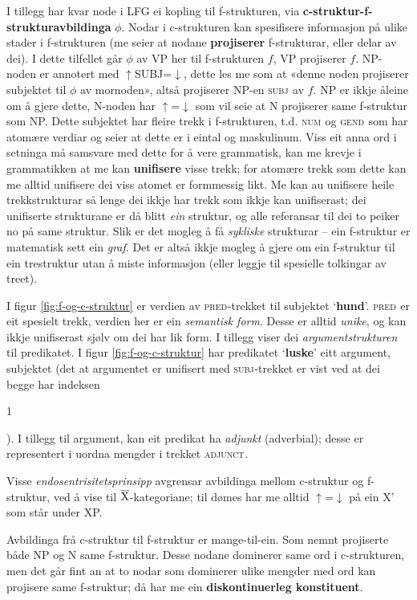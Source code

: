 \documentclass[12pt,a4paper,oneside,draft]{report}
\makeatletter
\newcommand{\xbar}{$\rm\overline{X}$}
\newcommand{\ind}[1]{{\avmoptions{center}\begin{avm}\@{#1}\end{avm}}}
\newcommand{\F}[2]{\textsc{#1}\ensuremath{_{#2}}}
\newcommand{\ADJUNCT}{\F{adjunct}{}}
\newcommand{\SUBJ}{\F{subj}{}}
\newcommand{\GEND}{\F{gend}{}}
\newcommand{\NUM}{\F{num}{}}
\newcommand{\PRED}{\F{pred}{}}
\newcommand{\ua}{\ensuremath{\uparrow}}
\newcommand{\da}{\ensuremath{\downarrow}}
\newcommand{\p}[1]{`\textbf{#1}'}
\makeatother
\begin{document}
 I tillegg har kvar node i LFG ei kopling til f\hyp{}strukturen, via
 \textbf{c\hyp{}struktur-f\hyp{}strukturavbildinga} $\phi{}$. Nodar i
 c\hyp{}strukturen kan spesifisere informasjon på ulike stader i
 f\hyp{}strukturen (me seier at nodane \textbf{projiserer} f\hyp{}strukturar,
 eller delar av dei).  I dette tilfellet går $\phi$ av VP her til
 f\hyp{}strukturen $f$, VP projiserer $f$. NP-noden er annotert med
 \ua{}SUBJ=\da{}, dette les me som at «denne noden projiserer
 subjektet til $\phi$ av mornoden», altså projiserer NP-en \SUBJ{} av
 $f$. NP er ikkje åleine om å gjere dette, N-noden har \ua{}=\da{} som
 vil seie at N projiserer same f\hyp{}struktur som NP. Dette subjektet
 har fleire trekk i f\hyp{}strukturen, t.d. \NUM{} og \GEND{} som har
 atomære verdiar og seier at dette er i eintal og maskulinum. Viss eit
 anna ord i setninga må samsvare med dette for å vere grammatisk, kan
 me krevje i grammatikken at me kan \textbf{unifisere} visse trekk; for
 atomære trekk som dette kan me alltid unifisere dei viss atomet er
 formmessig likt. Me kan au unifisere heile trekkstrukturar så lenge
 dei ikkje har trekk som ikkje kan unifiserast; dei unifiserte
 strukturane er då blitt \emph{ein} struktur, og alle referansar til dei to
 peiker no på same struktur. Slik er det mogleg å få \emph{sykliske}
 strukturar -- ein f\hyp{}struktur er matematisk sett ein \emph{graf}. Det
 er altså ikkje mogleg å gjere om ein f\hyp{}struktur til ein
 trestruktur utan å miste informasjon (eller leggje til spesielle
 tolkingar av treet).

 I figur \ref{fig:f-og-c-struktur} er verdien av \PRED{}-trekket til
 subjektet \p{hund}. \PRED{} er eit spesielt trekk, verdien her er ein
 \emph{semantisk form}. Desse er alltid \emph{unike}, og kan ikkje unifiserast
 sjølv om dei har lik form. I tillegg viser dei \emph{argumentstrukturen}
 til predikatet. I figur \ref{fig:f-og-c-struktur} har predikatet
 \p{luske} eitt argument, subjektet (det at argumentet er unifisert
 med \SUBJ{}-trekket er vist ved at dei begge har indeksen \ind{1}). I
 tillegg til argument, kan eit predikat ha \emph{adjunkt} (adverbial);
 desse er representert i uordna mengder i trekket \ADJUNCT{}.

 Visse \emph{endosentrisitetsprinsipp} avgrensar avbildinga mellom
 c\hyp{}struktur og f\hyp{}struktur, ved å vise til \xbar-kategoriane; til dømes
 har me alltid \ua=\da{} på ein X' som står under XP.

 Avbildinga frå c\hyp{}struktur til f\hyp{}struktur er mange-til-ein. Som nemnt
 projiserte både NP og N same f\hyp{}struktur. Desse nodane dominerer same
 ord i c\hyp{}strukturen, men det går fint an at to nodar som dominerer
 ulike mengder med ord kan projisere same f\hyp{}struktur; då har me ein
 \textbf{diskontinuerleg konstituent}.
\end{document}
